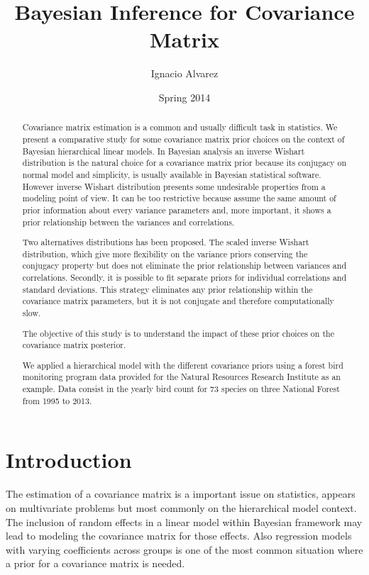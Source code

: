 \documentclass{article}
\title{Bayesian Inference for  Covariance Matrix}
\author{Ignacio Alvarez}
\date{ Spring 2014 }
\begin{document}
\maketitle 
\thispagestyle{empty}

\begin{abstract}
Covariance matrix estimation is a common and usually difficult task in statistics. We present a comparative study for some covariance matrix prior choices on the context of Bayesian hierarchical linear models. In Bayesian analysis an inverse Wishart distribution is the natural choice for a covariance matrix prior because its conjugacy on normal model and simplicity, is usually available in Bayesian statistical software. However inverse Wishart distribution presents some undesirable properties from a modeling point of view. It can be too restrictive because assume the same amount of prior information about every variance parameters and, more important, it shows a prior relationship between the variances and correlations.

Two alternatives distributions has been proposed. The scaled inverse Wishart distribution, which give more flexibility on the variance priors conserving the conjugacy property but does not eliminate the prior relationship between variances and correlations. Secondly, it is possible to fit separate priors for individual correlations and standard deviations. This strategy eliminates any prior relationship within the covariance matrix parameters, but it is not conjugate and therefore computationally slow. 

The objective of this study is to understand the impact of these prior choices on the covariance matrix posterior.

We applied a hierarchical model with the different covariance priors using a forest bird monitoring program data provided for the Natural Resources Research Institute as an example. Data consist in the yearly bird count for 73 species on three National Forest from 1995 to 2013.
\end{abstract}
\newpage 

\linespread{1.5}

\tableofcontents
\thispagestyle{empty}

\newpage 

\section{Introduction} 

The estimation of a covariance matrix is a important issue on statistics, appears on multivariate problems but most commonly on the hierarchical model context. The inclusion of random effects in a linear model within Bayesian framework may lead to modeling the covariance matrix for those effects. Also regression models with varying coefficients across groups is one of the most common situation where a prior for a covariance matrix is needed. 
\end{document}
